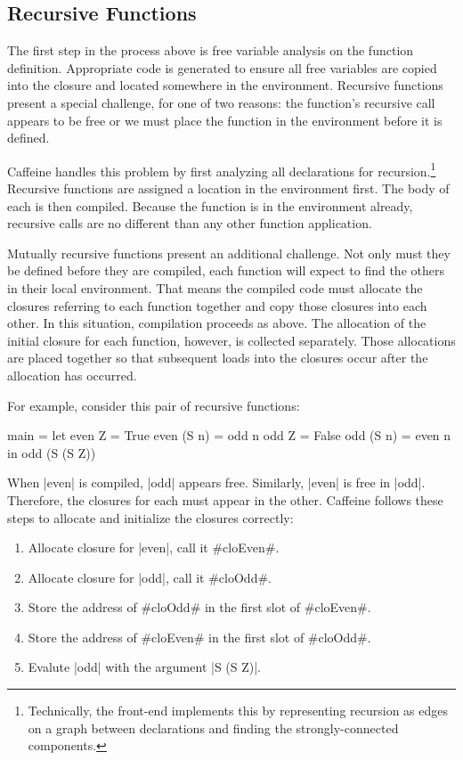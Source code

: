 \documentclass[11pt]{article}
\begin{document}
\subsection{Recursive Functions}

The first step in the process above is free variable analysis on the
function definition. Appropriate code is generated to ensure all free
variables are copied into the closure and located somewhere in the
environment. Recursive functions present a special challenge, for one
of two reasons: the function's recursive call appears to be free or
we must place the function in the environment before it is defined.

Caffeine handles this problem by first analyzing all declarations for
recursion.\footnote{Technically, the front-end implements this by
  representing recursion as edges on a graph between declarations and
  finding the strongly-connected components.} Recursive functions are
assigned a location in the environment first. The body of each is then
compiled. Because the function is in the environment already, recursive
calls are no different than any other function application.

Mutually recursive functions present an additional challenge. Not only
must they be defined before they are compiled, each function will
expect to find the others in their local environment. That means the
compiled code must allocate the closures referring to each function
together and copy those closures into each other. In this situation,
compilation proceeds as above. The allocation of the initial closure
for each function, however, is collected separately. Those allocations
are placed together so that subsequent loads into the closures occur
after the allocation has occurred.

For example, consider this pair of recursive functions:

\begin{code}
  main = 
       let  even Z      = True
            even (S n)  = odd n
            odd Z       = False
            odd (S n)   = even n
       in odd (S (S Z))
\end{code}

When |even| is compiled, |odd| appears free. Similarly, |even| is free
in |odd|. Therefore, the closures for each must appear in the
other. Caffeine follows these steps to allocate and initialize the
closures correctly:

\begin{enumerate}
 \item Allocate closure for |even|, call it #cloEven#.
 \item Allocate closure for |odd|, call it #cloOdd#.
 \item Store the address of #cloOdd# in the first slot of #cloEven#.
 \item Store the address of #cloEven# in the first slot of #cloOdd#.
 \item Evalute |odd| with the argument |S (S Z)|.
\end{enumerate}
\end{document}

